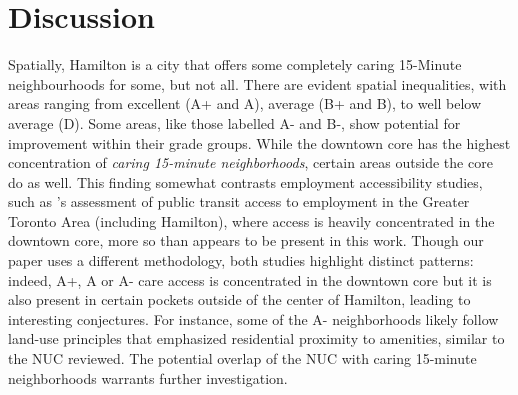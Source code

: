 \documentclass[
  authoryear,
  preprint,
  3p]{elsarticle}
\begin{document}
\section{Discussion}\label{discussion}

Spatially, Hamilton is a city that offers some completely caring
15-Minute neighbourhoods for some, but not all. There are evident
spatial inequalities, with areas ranging from excellent (A+ and A),
average (B+ and B), to well below average (D). Some areas, like those
labelled A- and B-, show potential for improvement within their grade
groups. While the downtown core has the highest concentration of
\emph{caring 15-minute neighborhoods}, certain areas outside the core do
as well. This finding somewhat contrasts employment accessibility
studies, such as \citet{elgeneidyNonstopEquityAssessing2016}'s
assessment of public transit access to employment in the Greater Toronto
Area (including Hamilton), where access is heavily concentrated in the
downtown core, more so than appears to be present in this work. Though
our paper uses a different methodology, both studies highlight distinct
patterns: indeed, A+, A or A- care access is concentrated in the
downtown core but it is also present in certain pockets outside of the
center of Hamilton, leading to interesting conjectures. For instance,
some of the A- neighborhoods likely follow land-use principles that
emphasized residential proximity to amenities, similar to the NUC
reviewed. The potential overlap of the NUC with caring 15-minute
neighborhoods warrants further investigation.
\end{document}
